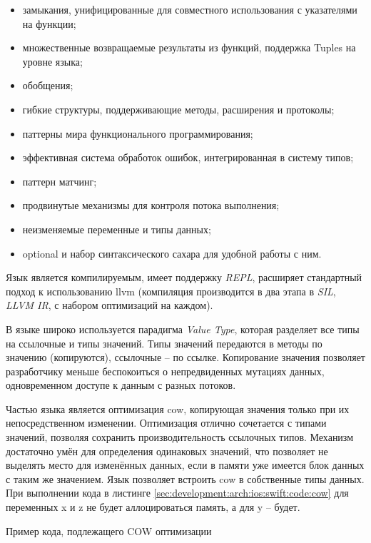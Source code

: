 \begin{itemize}
	\item замыкания, унифицированные для совместного использования с указателями на функции;
	\item множественные возвращаемые результаты из функций, поддержка Tuples на уровне языка;
	\item обобщения;
	\item гибкие структуры, поддерживающие методы, расширения и протоколы;
	\item паттерны мира функционального программирования;
	\item эффективная система обработок ошибок, интегрированная в систему типов;
	\item паттерн матчинг;
	\item продвинутые механизмы для контроля потока выполнения;
	\item неизменяемые переменные и типы данных;
	\item optional и набор синтаксического сахара для удобной работы с ним.
\end{itemize}

Язык является компилируемым, имеет поддержку \textit{REPL}, расширяет стандартный подход к использованию \gls{llvm} (компиляция производится в два этапа в \textit{SIL}, \textit{LLVM IR}, с набором оптимизаций на каждом).

В языке широко используется парадигма \textit{Value Type}, которая разделяет все типы на ссылочные и типы значений. Типы значений передаются в методы по значению (копируются), ссылочные -- по ссылке. Копирование значения позволяет разработчику меньше беспокоиться о непредвиденных мутациях данных, одновременном доступе к данным с разных потоков.

Частью языка является оптимизация \gls{cow}, копирующая значения только при их непосредственном изменении. Оптимизация отлично сочетается с типами значений, позволяя сохранить производительность ссылочных типов. Механизм достаточно умён для определения одинаковых значений, что позволяет не выделять место для изменённых данных, если в памяти уже имеется блок данных с таким же значением. Язык позволяет встроить \gls{cow} в собственные типы данных. При выполнении кода в листинге \ref{sec:development:arch:ios:swift:code:cow} для переменных x и z не будет аллоцироваться память, а для y -- будет.

\begin{code}
	
   \caption{Пример кода, подлежащего COW оптимизации}
   \label{sec:development:arch:ios:swift:code:cow}
\end{code}

